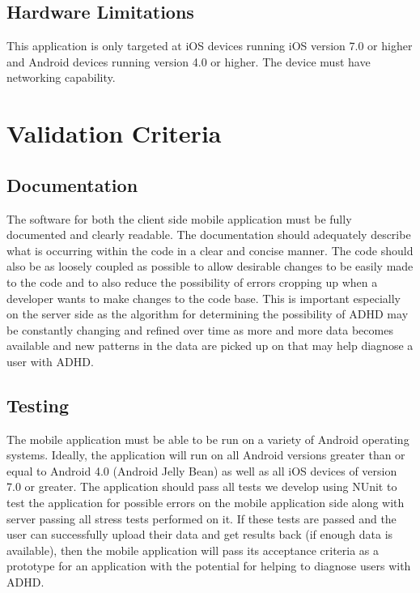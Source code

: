 \documentclass[a4wide]{article}
\begin{document}
\subsection{Hardware Limitations}

This application is only targeted at iOS devices running iOS version 7.0 or
higher and Android devices running version 4.0 or higher. The device must have
networking capability.





\section{Validation Criteria}

\subsection{Documentation}
The software for both the client side mobile application must be fully
documented and clearly readable. The documentation should adequately describe
what is occurring within the code in a clear and concise manner. The code should
also be as loosely coupled as possible to allow desirable changes to be easily
made to the code and to also reduce the possibility of errors cropping up when
a developer wants to make changes to the code base. This is important especially
on the server side as the algorithm for determining the possibility of ADHD may
be constantly changing and refined over time as more and more data becomes
available and new patterns in the data are picked up on that may help diagnose a
user with ADHD.
\subsection{Testing}
The mobile application must be able to be run on a variety of Android operating
systems. Ideally, the application will run on all Android versions greater than
or equal to Android 4.0 (Android Jelly Bean) as well as all iOS devices of
version 7.0 or greater. The application should pass all tests we develop using
NUnit to test the application for possible errors on the mobile application side
along with server passing all stress tests performed on it. If these tests are
passed and the user can successfully upload their data and get results back (if
enough data is available), then the mobile application will pass its acceptance
criteria as a prototype for an application with the potential for helping to
diagnose users with ADHD.
\end{document}
